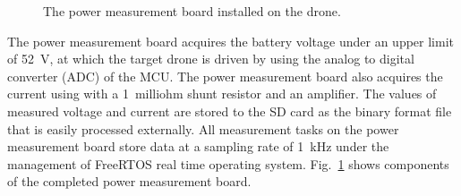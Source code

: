 \documentclass[journal]{./template/IEEEtran}
\begin{document}
\begin{figure}[ht]
\caption{The power measurement board installed on the drone.}
\label{fig:board}
\end{figure}

The power measurement board acquires the battery voltage under an upper limit of 52~V, at which the target drone is driven by using the analog to digital converter (ADC) of the MCU. The power measurement board also acquires the current using with a 1~milliohm shunt resistor and an amplifier.
The values of measured voltage and current are stored to the SD card as the binary format file that is easily processed externally.
All measurement tasks on the power measurement board store data at a sampling rate of 1~kHz under the management of FreeRTOS real time operating system.
Fig.~\ref{fig:board} shows components of the completed power measurement board.
\end{document}
